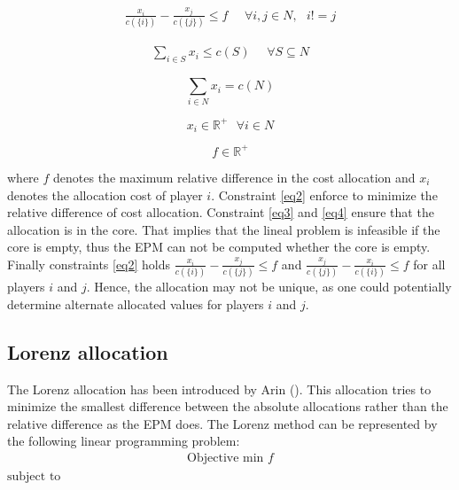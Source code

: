 \begin{equation}\label{eq2}
\begin{split}
\frac{x_i}{c(\{i\})} - \frac{x_j}{c(\{j\})} \leq f \textrm{ } \textrm{ } \forall i,j \in N,\textrm{ } i!=j
\end{split}
\end{equation}

\begin{equation}\label{eq3}
\begin{split}
\sum_{i \in S} x_i \leq c(S)\textrm{ }\textrm{ } \forall S \subseteq N
\end{split}
\end{equation}

\begin{equation}\label{eq4}
\sum_{i \in N} x_i  = c(N)
\end{equation}

\begin{equation}\label{eq5}
x_i \in \mathbb{R}^{+} \textrm{ } \forall i \in N
\end{equation}

\begin{equation}\label{eq6}
f \in \mathbb{R}^{+} 
\end{equation}

where $f$ denotes the maximum relative difference in the cost allocation and $x_i$ denotes the allocation cost of player $i$. Constraint \ref{eq2} enforce to minimize the relative difference of cost allocation. Constraint \ref{eq3} and \ref{eq4} ensure that the allocation is in the core. That implies that the lineal problem is infeasible if the core is empty, thus the EPM can not be computed whether the core is empty. Finally constraints \ref{eq2} holds $\frac{x_i}{c(\{i\})} - \frac{x_j}{c(\{j\})} \leq f$ and $\frac{x_j}{c(\{j\})} - \frac{x_i}{c(\{i\})} \leq f$ for all players $i$ and $j$. Hence, the allocation may not be unique, as one could potentially determine alternate allocated values for players $i$ and $j$.


\subsection{Lorenz allocation}
The Lorenz allocation has been introduced by Arin (\cite{Arin}). This allocation tries to minimize
the smallest difference between the absolute allocations rather than the relative difference as
the EPM does. The Lorenz method can be represented by the following linear programming
problem:
\begin{equation}\label{eq11}
\begin{split}
\textrm{Objective min } f
\end{split}
\end{equation}
$\textrm{subject to}$

